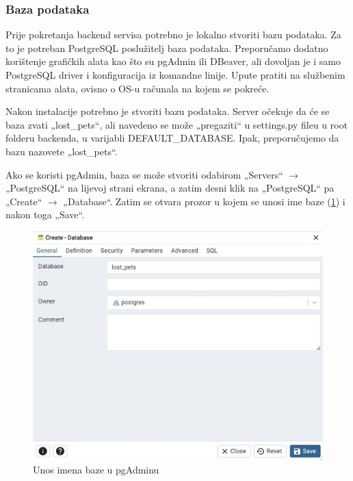 		\subsubsection{Baza podataka}
		
		Prije pokretanja backend servisa potrebno je lokalno stvoriti bazu podataka. Za to je potreban PostgreSQL poslužitelj baza podataka. Preporučamo dodatno korištenje grafičkih alata kao što su pgAdmin ili DBeaver, ali dovoljan je i samo PostgreSQL driver i konfiguracija iz komandne linije. Upute pratiti na službenim stranicama alata, ovisno o OS-u računala na kojem se pokreće.
		
		Nakon instalacije potrebno je stvoriti bazu podataka. Server očekuje da će se baza zvati „lost\_pets“, ali navedeno se može „pregaziti“ u settings.py fileu u root folderu backenda, u varijabli DEFAULT\_DATABASE. Ipak, preporučujemo da bazu nazovete „lost\_pets“.
		
		Ako se koristi pgAdmin, baza se može stvoriti odabirom „Servers“ $\rightarrow$ „PostgreSQL“ na lijevoj strani ekrana, a zatim desni klik na „PostgreSQL“ pa „Create“ $\rightarrow$ „Database“. Zatim se otvara prozor u kojem se unosi ime baze (\ref{fig:deploy1}) i nakon toga „Save“.
		
		\begin{figure}[H]
			\includegraphics[scale=0.65]{slike/deploy1.jpg} %
			\centering
			\caption{Unos imena baze u pgAdminu}
			\label{fig:deploy1}
		\end{figure}
		
